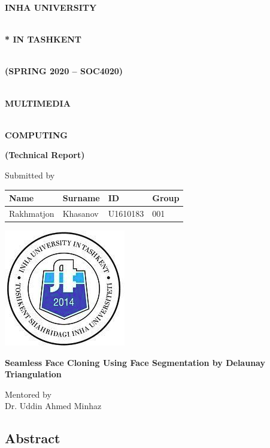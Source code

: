 \documentclass[12pt, a4paper, twocolumn]{article}
\date{}
\begin{document}
\begin{center}

\begin{@twocolumnfalse}
{\Huge \textbf{INHA UNIVERSITY}}

{\Huge \textbf{\\* IN TASHKENT}}

{\Huge \textbf{\\ (SPRING 2020 -- SOC4020)}}

{\Huge \textbf{\\ MULTIMEDIA}} 

{\Huge \textbf{\\ COMPUTING}}

{\Huge \textbf{(Technical Report)}}


Submitted by

\begin{longtable}[]{@{}llll@{}}
\toprule
Name & Surname & ID & Group\tabularnewline
\midrule
\endhead
Rakhmatjon & Khasanov & U1610183 & 001\tabularnewline
\bottomrule
\end{longtable}
\includegraphics{meta/output_29_0.png}

\end{@twocolumnfalse}

{\Large  \textbf{Seamless Face Cloning Using Face Segmentation by Delaunay Triangulation}} 
\end{center}

\tableofcontents

\begin{center}
{Mentored by \\ Dr. Uddin Ahmed Minhaz}
\end{center}
\clearpage

\subsection{Abstract}\label{header-n424}
\end{document}
